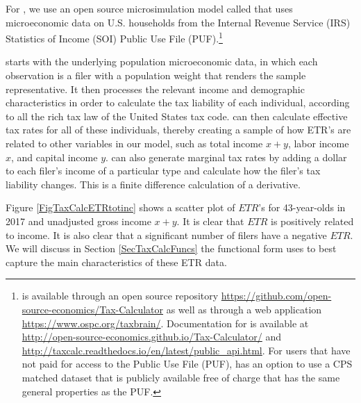   For \ogindia, we use an open source microsimulation model called \taxcalc that uses microeconomic data on U.S. households from the Internal Revenue Service (IRS) Statistics of Income (SOI) Public Use File (PUF).\footnote{\taxcalc is available through an open source repository \href{https://github.com/open-source-economics/Tax-Calculator}{https://github.com/open-source-economics/Tax-Calculator} as well as through a web application \href{https://www.ospc.org/taxbrain/}{https://www.ospc.org/taxbrain/}. Documentation for \taxcalc is available at \href{http://open-source-economics.github.io/Tax-Calculator/}{http://open-source-economics.github.io/Tax-Calculator/} and \href{http://taxcalc.readthedocs.io/en/latest/public_api.html}{http://taxcalc.readthedocs.io/en/latest/public\_api.html}. For users that have not paid for access to the Public Use File (PUF), \taxcalc has an option to use a CPS matched dataset that is publicly available free of charge that has the same general properties as the PUF.}

  \taxcalc starts with the underlying population microeconomic data, in which each observation is a filer with a population weight that renders the sample representative. It then processes the relevant income and demographic characteristics in order to calculate the tax liability of each individual, according to all the rich tax law of the United States tax code. \taxcalc can then calculate effective tax rates for all of these individuals, thereby creating a sample of how ETR's are related to other variables in our \ogindia model, such as total income $x + y$, labor income $x$, and capital income $y$. \taxcalc can also generate marginal tax rates by adding a dollar to each filer's income of a particular type and calculate how the filer's tax liability changes. This is a finite difference calculation of a derivative.

  Figure \ref{FigTaxCalcETRtotinc} shows a scatter plot of $ETR$'s for 43-year-olds in 2017 and unadjusted gross income $x + y$. It is clear that $ETR$ is positively related to income. It is also clear that a significant number of filers have a negative $ETR$. We will discuss in Section \ref{SecTaxCalcFuncs} the functional form \ogindia uses to best capture the main characteristics of these ETR data.

